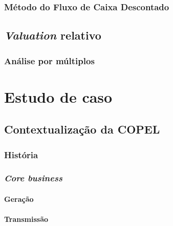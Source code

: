 \documentclass[grad,numbers]{coppe}
\begin{document}
  \hypertarget{muxe9todo-do-fluxo-de-caixa-descontado}{%
  \subsection{Método do Fluxo de Caixa Descontado}\label{muxe9todo-do-fluxo-de-caixa-descontado}}
  
  \hypertarget{valuation-relativo}{%
  \section{\texorpdfstring{\emph{Valuation} relativo}{Valuation relativo}}\label{valuation-relativo}}
  
  \hypertarget{anuxe1lise-por-muxfaltiplos}{%
  \subsection{Análise por múltiplos}\label{anuxe1lise-por-muxfaltiplos}}
  
  \hypertarget{estudo-de-caso}{%
  \chapter{Estudo de caso}\label{estudo-de-caso}}
  
  \hypertarget{contextualizauxe7uxe3o-da-copel}{%
  \section{Contextualização da COPEL}\label{contextualizauxe7uxe3o-da-copel}}
  
  \hypertarget{histuxf3ria}{%
  \subsection{História}\label{histuxf3ria}}
  
  \hypertarget{core-business}{%
  \subsection{\texorpdfstring{\emph{Core business}}{Core business}}\label{core-business}}
  
  \hypertarget{gerauxe7uxe3o}{%
  \subsubsection{Geração}\label{gerauxe7uxe3o}}
  
  \hypertarget{transmissuxe3o}{%
  \subsubsection{Transmissão}\label{transmissuxe3o}}
  
\end{document}
